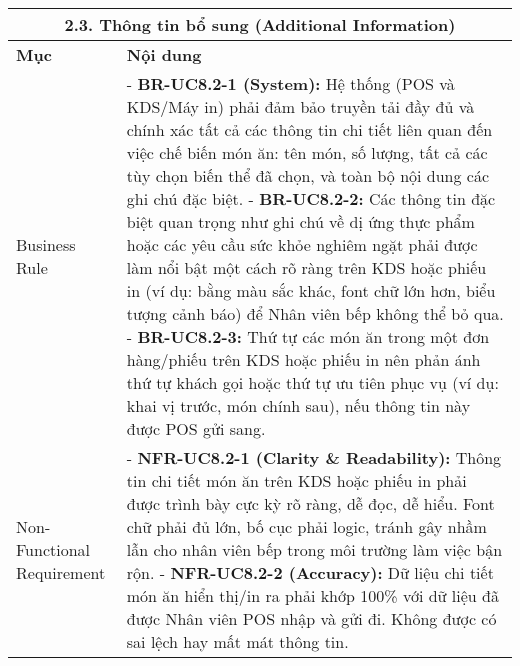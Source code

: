 \begin{longtable}{|m{4cm}|p{11cm}|}
\hline
\multicolumn{2}{|c|}{\textbf{2.3. Thông tin bổ sung (Additional Information)}} \\
\hline
\textbf{Mục} & \textbf{Nội dung} \\
\hline
Business Rule & - \textbf{BR-UC8.2-1 (System):} Hệ thống (POS và KDS/Máy in) phải đảm bảo truyền tải đầy đủ và chính xác tất cả các thông tin chi tiết liên quan đến việc chế biến món ăn: tên món, số lượng, tất cả các tùy chọn biến thể đã chọn, và toàn bộ nội dung các ghi chú đặc biệt. \newline - \textbf{BR-UC8.2-2:} Các thông tin đặc biệt quan trọng như ghi chú về dị ứng thực phẩm hoặc các yêu cầu sức khỏe nghiêm ngặt phải được làm nổi bật một cách rõ ràng trên KDS hoặc phiếu in (ví dụ: bằng màu sắc khác, font chữ lớn hơn, biểu tượng cảnh báo) để Nhân viên bếp không thể bỏ qua. \newline - \textbf{BR-UC8.2-3:} Thứ tự các món ăn trong một đơn hàng/phiếu trên KDS hoặc phiếu in nên phản ánh thứ tự khách gọi hoặc thứ tự ưu tiên phục vụ (ví dụ: khai vị trước, món chính sau), nếu thông tin này được POS gửi sang. \\
\hline
Non-Functional Requirement & - \textbf{NFR-UC8.2-1 (Clarity \& Readability):} Thông tin chi tiết món ăn trên KDS hoặc phiếu in phải được trình bày cực kỳ rõ ràng, dễ đọc, dễ hiểu. Font chữ phải đủ lớn, bố cục phải logic, tránh gây nhầm lẫn cho nhân viên bếp trong môi trường làm việc bận rộn. \newline - \textbf{NFR-UC8.2-2 (Accuracy):} Dữ liệu chi tiết món ăn hiển thị/in ra phải khớp 100\% với dữ liệu đã được Nhân viên POS nhập và gửi đi. Không được có sai lệch hay mất mát thông tin. \\
\hline
\end{longtable}


